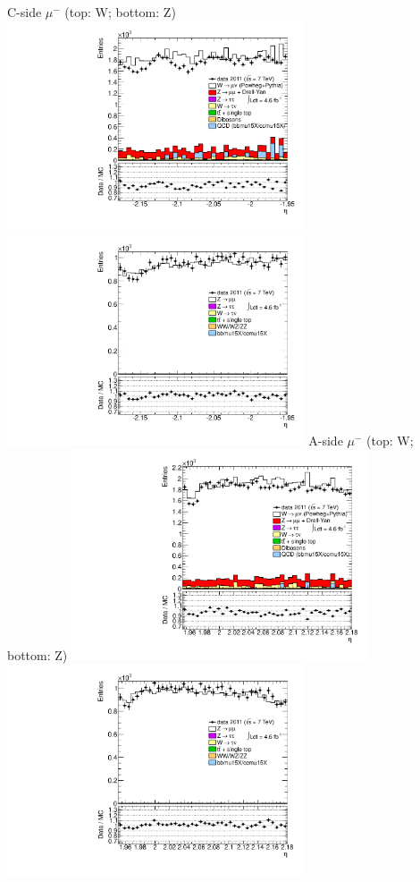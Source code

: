  {
\colb[T]
C-side $\mu^{-}$ (top: W; bottom: Z)
\centering
\includegraphics[width=0.66\textwidth]{dates/20130306/figures/avgmu/Wavgmu0_6_10_C_stack_l_eta_NEG} \\
\includegraphics[width=0.66\textwidth]{dates/20130306/figures/both/Z_10_C_stack_lN_eta_ALL.pdf}
A-side $\mu^{-}$ (top: W; bottom: Z)
\centering
\includegraphics[width=0.66\textwidth]{dates/20130306/figures/avgmu/Wavgmu0_6_10_A_stack_l_eta_NEG} \\
\includegraphics[width=0.66\textwidth]{dates/20130306/figures/both/Z_10_A_stack_lN_eta_ALL.pdf} 
\cole
}
